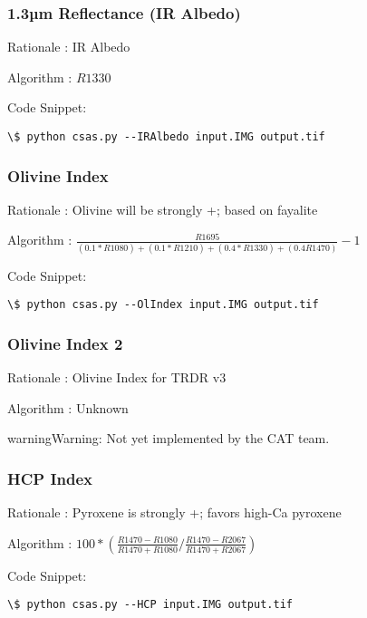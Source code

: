 \documentclass[letterpaper,10pt,english]{sphinxmanual}
\begin{document}
\subsubsection{1.3µm Reflectance (IR Albedo)}
\label{Algorithms:m-reflectance-ir-albedo}
Rationale : IR Albedo

Algorithm : $R1330$

Code Snippet:

\begin{Verbatim}[commandchars=\\\{\}]
\$ python csas.py --IRAlbedo input.IMG output.tif
\end{Verbatim}


\subsubsection{Olivine Index}
\label{Algorithms:olivine-index}
Rationale : Olivine will be strongly +; based on fayalite

Algorithm : $\frac{R1695}{(0.1*R1080)+(0.1*R1210)+(0.4*R1330)+(0.4R1470)}-1$

Code Snippet:

\begin{Verbatim}[commandchars=\\\{\}]
\$ python csas.py --OlIndex input.IMG output.tif
\end{Verbatim}


\subsubsection{Olivine Index 2}
\label{Algorithms:olivine-index-2}
Rationale : Olivine Index for TRDR v3

Algorithm : Unknown

\begin{notice}{warning}{Warning:}
Not yet implemented by the CAT team.
\end{notice}


\subsubsection{HCP Index}
\label{Algorithms:hcp-index}
Rationale : Pyroxene is strongly +; favors high-Ca pyroxene

Algorithm : $100 * (\frac{R1470-R1080}{R1470+R1080} / \frac{R1470-R2067}{R1470+R2067})$

Code Snippet:

\begin{Verbatim}[commandchars=\\\{\}]
\$ python csas.py --HCP input.IMG output.tif
\end{Verbatim}
\end{document}
